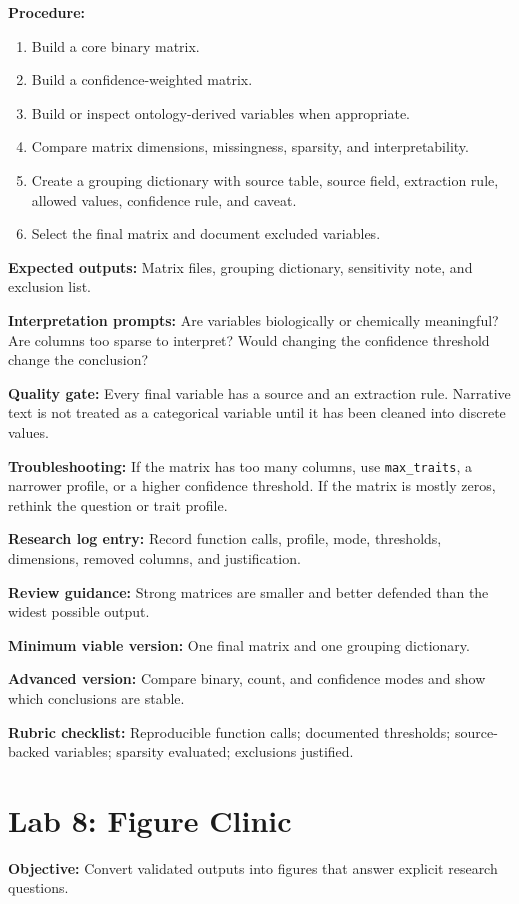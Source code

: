 \textbf{Procedure:}
\begin{enumerate}
  \item Build a core binary matrix.
  \item Build a confidence-weighted matrix.
  \item Build or inspect ontology-derived variables when appropriate.
  \item Compare matrix dimensions, missingness, sparsity, and interpretability.
  \item Create a grouping dictionary with source table, source field, extraction rule, allowed values, confidence rule, and caveat.
  \item Select the final matrix and document excluded variables.
\end{enumerate}

\textbf{Expected outputs:} Matrix files, grouping dictionary, sensitivity note, and exclusion list.

\textbf{Interpretation prompts:} Are variables biologically or chemically meaningful? Are columns too sparse to interpret? Would changing the confidence threshold change the conclusion?

\textbf{Quality gate:} Every final variable has a source and an extraction rule. Narrative text is not treated as a categorical variable until it has been cleaned into discrete values.

\textbf{Troubleshooting:} If the matrix has too many columns, use \texttt{max\_traits}, a narrower profile, or a higher confidence threshold. If the matrix is mostly zeros, rethink the question or trait profile.

\textbf{Research log entry:} Record function calls, profile, mode, thresholds, dimensions, removed columns, and justification.

\textbf{Review guidance:} Strong matrices are smaller and better defended than the widest possible output.

\textbf{Minimum viable version:} One final matrix and one grouping dictionary.

\textbf{Advanced version:} Compare binary, count, and confidence modes and show which conclusions are stable.

\textbf{Rubric checklist:} Reproducible function calls; documented thresholds; source-backed variables; sparsity evaluated; exclusions justified.

\section{Lab 8: Figure Clinic}
\textbf{Objective:} Convert validated outputs into figures that answer explicit research questions.

